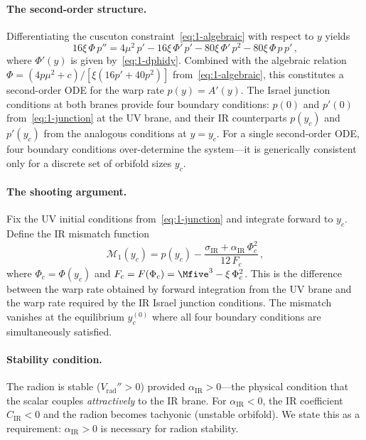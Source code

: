 \paragraph{The second-order structure.} Differentiating the cuscuton constraint~\eqref{eq:1-algebraic} with respect to $y$ yields
\begin{equation}
\label{eq:1-radion-ode}
16\xi\,\Phi\, p'' = 4\mu^2\, p' - 16\xi\,\Phi'\, p' - 80\xi\,\Phi'\, p^2 - 80\xi\,\Phi\, p\, p'\,,
\end{equation}
where $\Phi'(y)$ is given by~\eqref{eq:1-dphidy}. Combined with the algebraic relation $\Phi = (4p\mu^2 + c)/[\xi(16p' + 40p^2)]$ from~\eqref{eq:1-algebraic}, this constitutes a second-order ODE for the warp rate $p(y) = A'(y)$. The Israel junction conditions at both branes provide four boundary conditions: $p(0)$ and $p'(0)$ from~\eqref{eq:1-junction} at the UV brane, and their IR counterparts $p(y_c)$ and $p'(y_c)$ from the analogous conditions at $y = y_c$. For a single second-order ODE, four boundary conditions over-determine the system---it is generically consistent only for a discrete set of orbifold sizes $y_c$.

\paragraph{The shooting argument.} Fix the UV initial conditions from~\eqref{eq:1-junction} and integrate forward to $y_c$. Define the IR mismatch function
\begin{equation}
\label{eq:1-mismatch}
\mathcal{M}_1(y_c) = p(y_c) - \frac{\sigma_{\mathrm{IR}} + \alpha_{\mathrm{IR}}\,\Phi_c^2}{12\, F_c}\,,
\end{equation}
where $\Phi_c = \Phi(y_c)$ and $F_c = F(\Phi_c) = \Mfive^3 - \xi\,\Phi_c^2$. This is the difference between the warp rate obtained by forward integration from the UV brane and the warp rate required by the IR Israel junction conditions. The mismatch vanishes at the equilibrium $y_c^{(0)}$ where all four boundary conditions are simultaneously satisfied.

\paragraph{Stability condition.} The radion is stable ($V_{\mathrm{rad}}'' > 0$) provided $\alpha_{\mathrm{IR}} > 0$---the physical condition that the scalar couples \emph{attractively} to the IR brane. For $\alpha_{\mathrm{IR}} < 0$, the IR coefficient $C_{\mathrm{IR}} < 0$ and the radion becomes tachyonic (unstable orbifold). We state this as a requirement: $\alpha_{\mathrm{IR}} > 0$ is necessary for radion stability.

